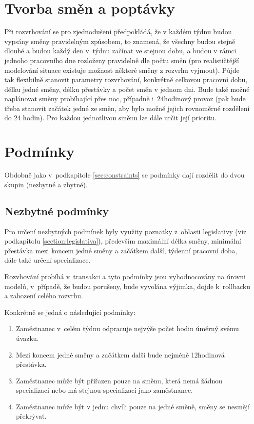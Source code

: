 \documentclass[twoside]{ctuthesis}
\begin{document}
\section{Tvorba směn a poptávky}\label{sub:demand}
Při rozvrhování se pro zjednodušení předpokládá, že v každém týdnu budou vypsány směny pravidelným způsobem, to znamená, že všechny budou stejně dlouhé a budou každý den v~týdnu začínat ve stejnou dobu, a budou v rámci jednoho pracovního dne rozloženy pravidelně dle počtu směn (pro realističtější modelování situace existuje možnost některé směny z rozvrhu vyjmout). Půjde tak flexibilně stanovit parametry rozvrhování, konkrétně celkovou pracovní dobu, délku jedné směny, délku přestávky a počet směn v jednom dni. Bude také možné naplánovat směny probíhající přes noc, případně i~24hodinový provoz (pak bude třeba stanovit začátek jedné ze směn, aby bylo možné jejich rovnoměrné rozdělení do 24 hodin). Pro každou jednotlivou směnu lze dále určit její prioritu.

\section{Podmínky}
Obdobně jako v~podkapitole \ref{sec:constraints} se podmínky dají rozdělit do dvou skupin (nezbytné a zbytné).

\subsection{Nezbytné podmínky}
Pro určení nezbytných podmínek byly využity poznatky z~oblasti legislativy (viz podkapitolu \ref{section:legislativa}), především maximální délka směny, minimální přestávka mezi koncem jedné směny a začátkem další, týdenní pracovní doba, dále také určení specializace.

Rozvhování probíhá v~transakci a tyto podmínky jsou vyhodnocovány na úrovni modelů, v~případě, že budou porušeny, bude vyvolána výjimka, dojde k~rollbacku a zahození celého rozvrhu.

Konkrétně se jedná o následující podmínky:

\begin{enumerate}
	\item Zaměstnanec v~celém týdnu odpracuje nejvýše počet hodin úměrný svému úvazku.
	\item Mezi koncem jedné směny a začátkem další bude nejméně 12hodinová přestávka.
	\item Zaměstnanec může být přiřazen pouze na směnu, která nemá žádnou specializaci nebo má stejnou specializaci jako zaměstnanec.
	\item Zaměstnanec může být v jednu chvíli pouze na jedné směně, směny se nesmějí překrývat.
\end{enumerate}
\end{document}
